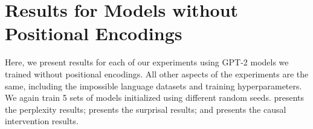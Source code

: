 \documentclass[11pt]{article}
\begin{document}
     


\section{Results for Models without Positional Encodings} \label{sec:appendix-no-pos-encoding}

Here, we present results for each of our experiments using GPT-2 models we trained without positional encodings. All other aspects of the experiments are the same, including the impossible language datasets and training hyperparameters. We again train 5 sets of models initialized using different random seeds.  presents the perplexity results;  presents the surprisal results; and  presents the causal intervention results.
\end{document}
